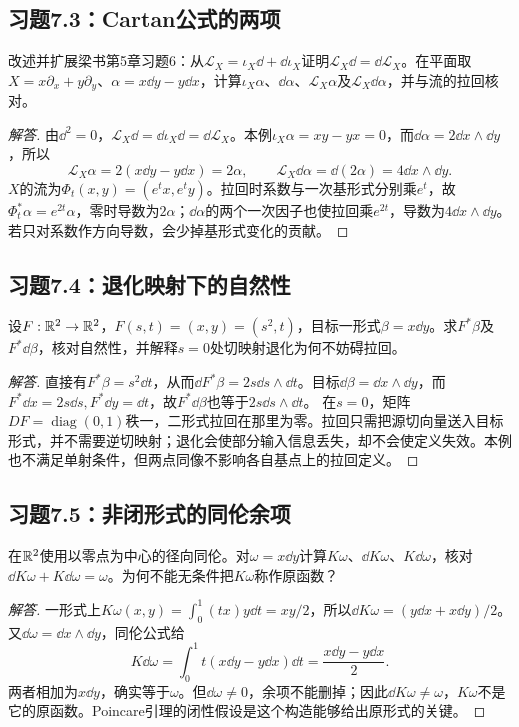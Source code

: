 \subsection*{习题7.3：Cartan公式的两项}
改述并扩展梁书第5章习题6：从$\mathcal L_X=\iota_X\dd+\dd\iota_X$证明$\mathcal L_X\dd=\dd\mathcal L_X$。在平面取$X=x\partial_x+y\partial_y$、$\alpha=x\dd y-y\dd x$，计算$\iota_X\alpha$、$\dd\alpha$、$\mathcal L_X\alpha$及$\mathcal L_X\dd\alpha$，并与流的拉回核对。
\begin{proof}[解答]
由$\dd^2=0$，$\mathcal L_X\dd=\dd\iota_X\dd=\dd\mathcal L_X$。本例$\iota_X\alpha=xy-yx=0$，而$\dd\alpha=2\dd x\wedge\dd y$，所以
\[
 \mathcal L_X\alpha=2(x\dd y-y\dd x)=2\alpha,
 \qquad \mathcal L_X\dd\alpha=\dd(2\alpha)=4\dd x\wedge\dd y.
\]
$X$的流为$\Phi_t(x,y)=(e^tx,e^ty)$。拉回时系数与一次基形式分别乘$e^t$，故$\Phi_t^*\alpha=e^{2t}\alpha$，零时导数为$2\alpha$；$\dd\alpha$的两个一次因子也使拉回乘$e^{2t}$，导数为$4\dd x\wedge\dd y$。若只对系数作方向导数，会少掉基形式变化的贡献。
\end{proof}

\subsection*{习题7.4：退化映射下的自然性}
设$F:\mathbb{R}^2\to\mathbb{R}^2$，$F(s,t)=(x,y)=(s^2,t)$，目标一形式$\beta=x\dd y$。求$F^*\beta$及$F^*\dd\beta$，核对自然性，并解释$s=0$处切映射退化为何不妨碍拉回。
\begin{proof}[解答]
直接有$F^*\beta=s^2\dd t$，从而$\dd F^*\beta=2s\dd s\wedge\dd t$。目标$\dd\beta=\dd x\wedge\dd y$，而$F^*\dd x=2s\dd s,F^*\dd y=\dd t$，故$F^*\dd\beta$也等于$2s\dd s\wedge\dd t$。
在$s=0$，矩阵$DF=\operatorname{diag}(0,1)$秩一，二形式拉回在那里为零。拉回只需把源切向量送入目标形式，并不需要逆切映射；退化会使部分输入信息丢失，却不会使定义失效。本例也不满足单射条件，但两点同像不影响各自基点上的拉回定义。
\end{proof}

\subsection*{习题7.5：非闭形式的同伦余项}
在$\mathbb{R}^2$使用以零点为中心的径向同伦。对$\omega=x\dd y$计算$K\omega$、$\dd K\omega$、$K\dd\omega$，核对$\dd K\omega+K\dd\omega=\omega$。为何不能无条件把$K\omega$称作原函数？
\begin{proof}[解答]
一形式上$K\omega(x,y)=\int_0^1(tx)y\dd t=xy/2$，所以$\dd K\omega=(y\dd x+x\dd y)/2$。又$\dd\omega=\dd x\wedge\dd y$，同伦公式给
\[
 K\dd\omega=\int_0^1t(x\dd y-y\dd x)\dd t
 =\frac{x\dd y-y\dd x}{2}.
\]
两者相加为$x\dd y$，确实等于$\omega$。但$\dd\omega\ne0$，余项不能删掉；因此$\dd K\omega\ne\omega$，$K\omega$不是它的原函数。Poincare引理的闭性假设是这个构造能够给出原形式的关键。
\end{proof}

